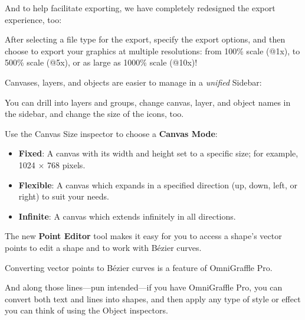 \documentclass[../main.tex]{subfiles}
\begin{document}

And to help facilitate exporting, we have completely redesigned the export experience, too:


After selecting a file type for the export, specify the export options, and then choose to
export your graphics at multiple resolutions: from 100\% scale (@1x), to 500\% scale (@5x), or
as large as 1000\% scale (@10x)!


Canvases, layers, and objects are easier to manage in a \textit{unified} Sidebar:


You can drill into layers and groups, change canvas, layer, and object names in the sidebar, and
change the size of the icons, too.

Use the Canvas Size inspector to choose a \textbf{Canvas Mode}:

\begin{itemize}
  \item \textbf{Fixed}: A canvas with its width and height set to a specific size; for example,
    1024 $\times$ 768 pixels.
  \item \textbf{Flexible}: A canvas which expands in a specified direction (up, down, left, or
    right) to suit your needs.
  \item \textbf{Infinite}: A canvas which extends infinitely in all directions.
\end{itemize}


The new \textbf{Point Editor} tool makes it easy for you to access a shape's vector points to
edit a shape and to work with Bézier curves.


\begin{ognote}
  Converting vector points to Bézier curves is a feature of OmniGraffle Pro.
\end{ognote}

And along those lines---pun intended---if you have OmniGraffle Pro, you can convert both text
and lines into shapes, and then apply any type of style or effect you can think of using the
Object inspectors.

\end{document}
